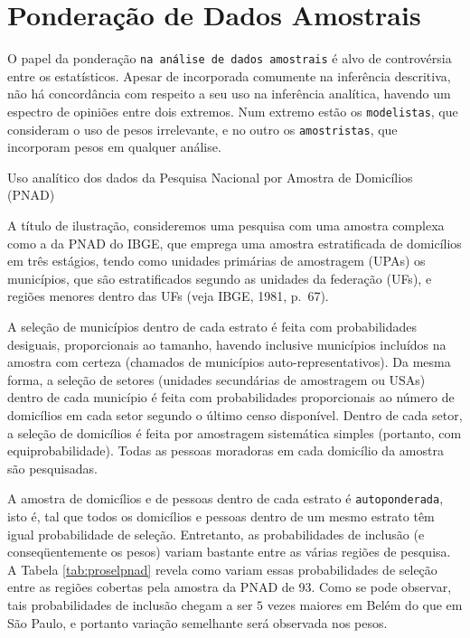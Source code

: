\documentclass[]{book}
\numberwithin{example}{chapter}
\numberwithin{remark}{chapter}
\numberwithin{definition}{chapter}
\let\BeginKnitrBlock\begin \let\EndKnitrBlock\end
\begin{document}
\section{Ponderação de Dados
Amostrais}\label{ponderacao-de-dados-amostrais}

O papel da ponderação \texttt{na\ análise\ de\ dados\ amostrais} é alvo
de controvérsia entre os estatísticos. Apesar de incorporada comumente
na inferência descritiva, não há concordância com respeito a seu uso na
inferência analítica, havendo um espectro de opiniões entre dois
extremos. Num extremo estão os \texttt{modelistas}, que consideram o uso
de pesos irrelevante, e no outro os \texttt{amostristas}, que incorporam
pesos em qualquer análise.

\BeginKnitrBlock{example}
\protect\hypertarget{ex:unnamed-chunk-83}{}{\label{ex:unnamed-chunk-83}}Uso
analítico dos dados da Pesquisa Nacional por Amostra de Domicílios
(PNAD)
\EndKnitrBlock{example}

A título de ilustração, consideremos uma pesquisa com uma amostra
complexa como a da PNAD do IBGE, que emprega uma amostra estratificada
de domicílios em três estágios, tendo como unidades primárias de
amostragem (UPAs) os municípios, que são estratificados segundo as
unidades da federação (UFs), e regiões menores dentro das UFs (veja
IBGE, 1981, p.~67).

A seleção de municípios dentro de cada estrato é feita com
probabilidades desiguais, proporcionais ao tamanho, havendo inclusive
municípios incluídos na amostra com certeza (chamados de municípios
auto-representativos). Da mesma forma, a seleção de setores (unidades
secundárias de amostragem ou USAs) dentro de cada município é feita com
probabilidades proporcionais ao número de domicílios em cada setor
segundo o último censo disponível. Dentro de cada setor, a seleção de
domicílios é feita por amostragem sistemática simples (portanto, com
equiprobabilidade). Todas as pessoas moradoras em cada domicílio da
amostra são pesquisadas.

A amostra de domicílios e de pessoas dentro de cada estrato é
\texttt{autoponderada}, isto é, tal que todos os domicílios e pessoas
dentro de um mesmo estrato têm igual probabilidade de seleção.
Entretanto, as probabilidades de inclusão (e conseqüentemente os pesos)
variam bastante entre as várias regiões de pesquisa. A Tabela
\ref{tab:proselpnad} revela como variam essas probabilidades de seleção
entre as regiões cobertas pela amostra da PNAD de 93. Como se pode
observar, tais probabilidades de inclusão chegam a ser \(5\) vezes
maiores em Belém do que em São Paulo, e portanto variação semelhante
será observada nos pesos.
\end{document}
